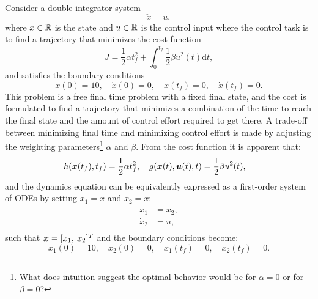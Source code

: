 \begin{example} \label{ex:ocp}
\theoremstyle{definition}
Consider a double integrator system
\begin{equation*}
    \ddot{x} = u,
\end{equation*}
where $x \in \mathbb{R}$ is the state and $u \in \mathbb{R}$ is the control input where the control task is to find a trajectory that minimizes the cost function
\begin{equation*}
J = \frac{1}{2}\alpha t_f^2 + \int_{0}^{t_f} \frac{1}{2}\beta u^2(t) \mathrm{d}t,
\end{equation*}
and satisfies the boundary conditions
\begin{equation*}
x(0) = 10,\quad \dot{x}(0) = 0,\quad x(t_f) = 0,\quad \dot{x}(t_f) = 0.
\end{equation*}
This problem is a free final time problem with a fixed final state, and the cost is formulated to find a trajectory that minimizes a combination of the time to reach the final state and the amount of control effort required to get there. A trade-off between minimizing final time and minimizing control effort is made by adjusting the weighting parameters\footnote{What does intuition suggest the optimal behavior would be for $\alpha = 0$ or for $\beta=0$?} $\alpha$ and $\beta$. From the cost function it is apparent that:
\begin{equation*}
\begin{split}
h(\bm{x}(t_f), t_f) &= \frac{1}{2}\alpha t_f^2, \quad g(\bm{x}(t), \bm{u}(t), t) = \frac{1}{2}\beta u^2(t), 
\end{split}
\end{equation*}
and the dynamics equation can be equivalently expressed as a first-order system of ODEs by setting $x_1 = x$ and $x_2 = \dot{x}$:
\begin{equation*}
\begin{split}
\dot{x}_1 &= x_2, \\
\dot{x}_2 &= u, \\
\end{split}
\end{equation*}
such that $\bm{x} = [x_1, \: x_2]^T$ and the boundary conditions become:
\begin{equation*}
x_1(0) = 10, \quad x_2(0) = 0,\quad x_1(t_f) = 0,\quad x_2(t_f) = 0.
\end{equation*}


\end{example}
